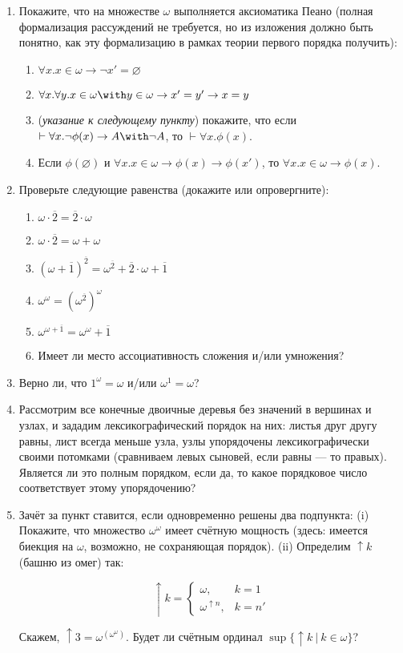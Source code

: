 \documentclass[10pt,a4paper,oneside]{article}
\begin{document}
\begin{enumerate}
\item Покажите, что на множестве $\omega$ выполняется аксиоматика Пеано (полная формализация рассуждений не требуется,
но из изложения должно быть понятно, как эту формализацию в рамках теории первого порядка получить):
\begin{enumerate}
\item $\forall x.x \in \omega \rightarrow \neg x' = \varnothing$
\item $\forall x.\forall y.x \in \omega \with y \in \omega \rightarrow x' = y' \rightarrow x = y$
\item (\emph{указание к следующему пункту}) покажите, что если $\vdash\forall x.\neg\phi(x)\rightarrow A\with\neg A$, то $\vdash\forall x.\phi(x)$.
\item Если $\phi(\varnothing)$ и $\forall x.x \in \omega \rightarrow \phi(x) \rightarrow \phi(x')$, 
то $\forall x.x \in \omega \rightarrow \phi(x)$.
\end{enumerate}
\item Проверьте следующие равенства (докажите или опровергните):
\begin{enumerate}
\item $\omega\cdot\overline{2} = \overline{2}\cdot\omega$
\item $\omega\cdot\overline{2} = \omega + \omega$
\item $(\omega+\overline{1})^{\overline{2}} = \omega^{\overline{2}} + \overline{2}\cdot \omega + \overline{1}$
\item $\omega ^ \omega = (\omega ^ {\overline{2}}) ^ \omega$
\item $\omega ^ {\omega + \overline{1}} = \omega ^ \omega + \overline{1}$
\item Имеет ли место ассоциативность сложения и/или умножения?
\end{enumerate}
\item Верно ли, что $1^\omega = \omega$ и/или $\omega^1 = \omega$?
\item Рассмотрим все конечные двоичные деревья без значений в вершинах и узлах, и зададим лексикографический порядок на них:
листья друг другу равны, лист всегда меньше узла, узлы упорядочены лексикографически своими потомками 
(сравниваем левых сыновей, если равны --- то правых). Является ли это полным порядком, если да, то какое порядковое число 
соответствует этому упорядочению?
\item Зачёт за пункт ставится, если одновременно решены два подпункта:
(i) Покажите, что множество $\omega^\omega$ имеет счётную мощность (здесь: имеется биекция на $\omega$, возможно, не 
сохраняющая порядок). 
(ii) Определим $\uparrow k$ (башню из омег) так:

$$\uparrow k = \left\{\begin{array}{ll}\omega,&k = 1\\\omega^{\uparrow n},&k = n'\end{array}\right.$$

Скажем, $\uparrow 3 = \omega^{\left(\omega^\omega\right)}$. Будет ли счётным ординал $\sup\{\uparrow k\ |\ k \in \omega\}$?
\end{enumerate}
\end{document}
